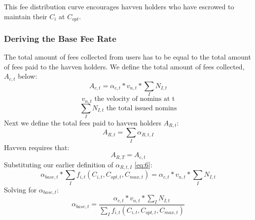 \begin{center}
\end{center}

\noindent This fee distribution curve encourages havven holders who have escrowed to maintain their $C_i$ at $C_{opt}$.  \\

\newpage

\subsubsection{Deriving the Base Fee Rate}The total amount of fees collected from users has to be equal to the total amount of fees paid to the havven holders. We define the total amount of fees collected, $A_{c,t}$ below: \\
\begin{equation}
A_{c,t}  = \alpha_{c,t} * v_{n,t} * \sum\limits_I N_{I,t}  \label{eq:8}
\end{equation}
$$ v_{n,t} \text{ the velocity of nomins at t} $$
$$  \sum\limits_I N_{I,t} \text{ the total issued nomins} $$
Next we define the total fees paid to havven holders $A_{R,t}$: \\
\begin{equation}
A_{R,t} = \sum\limits_I \alpha_{R,t,I} \label{eq:9}
\end{equation}
Havven requires that: \\
$$ A_{R,T} =  A_{c,t} $$
Substituting our earlier definition of $\alpha_{R,t,I}$ \eqref{eq:6}: \\
$$ \alpha_{base,t} *\sum\limits_I f_{i,t}(C_{i,t}, C_{opt,t}, C_{max,t}) =  \alpha_{c,t} * v_{n,t} * \sum\limits_I N_{I,t} $$
Solving for $\alpha_{base,t} $:\\
\begin{equation}
\alpha_{base,t} = \frac{\alpha_{c,t} * v_{n,t} * \sum\limits_I N_{I,t}}{\sum\limits_I f_{i,t}(C_{i,t}, C_{opt,t},C_{max,t})} \label{eq:10}
\end{equation}

